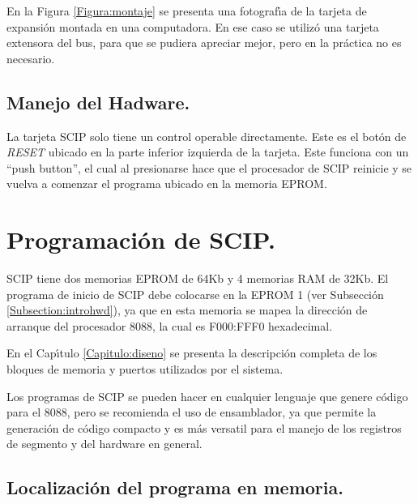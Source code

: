 En la Figura \ref{Figura:montaje} se presenta una fotograf\'{\i}a de la tarjeta de %
expansi\'on montada en una computadora. En ese caso se utiliz\'o una tarjeta extensora del bus, %
para que se pudiera apreciar mejor, pero en la pr\'actica no es necesario.


\subsection{Manejo del Hadware.}
\label{Subsection:manejo}

La tarjeta SCIP solo tiene un control operable directamente. Este es el bot\'on de {\it %
RESET\/} ubicado en la parte inferior izquierda de la tarjeta. Este funciona con un ``push %
button'', el cual al presionarse hace que el procesador de SCIP reinicie y se vuelva a comenzar %
el programa ubicado en la memoria EPROM.


\section{Programaci\'on de SCIP.}
\label{Section:prograSCIP}

SCIP tiene dos memorias EPROM de 64Kb y 4 memorias RAM de 32Kb. El programa de inicio de SCIP %
debe colocarse en la EPROM 1 (ver Subsecci\'on \ref{Subsection:introhwd}), ya que en esta %
memoria se mapea la direcci\'on de arranque del procesador 8088, la cual es F000:FFF0 %
hexadecimal.

En el Cap\'{\i}tulo \ref{Capitulo:diseno} se presenta la descripci\'on completa de los %
bloques de memoria y puertos utilizados por el sistema.

Los programas de SCIP se pueden hacer en cualquier lenguaje que genere c\'odigo para el 8088, %
pero se recomienda el uso de ensamblador, ya que permite la generaci\'on de c\'odigo compacto y %
es m\'as versatil para el manejo de los registros de segmento y del hardware en general.


\subsection{Localizaci\'on del programa en memoria.}
\label{Section:locprog}

